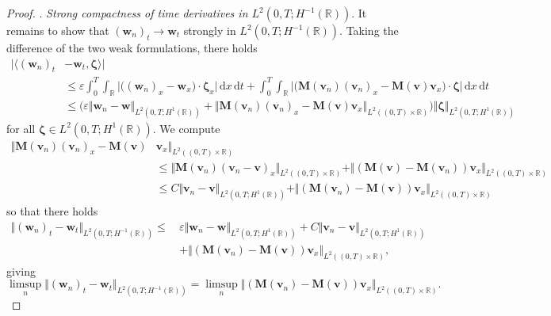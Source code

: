 \documentclass[10pt,a4paper]{amsart}
\newcommand{\bM}{\mathbf{M}}
\newcommand{\bv}{\mathbf{v}}
\newcommand{\bw}{\mathbf{w}}
\newcommand{\bzeta}{\boldsymbol{\zeta}}
\renewcommand{\d}{\, \mathrm{d}}
\renewcommand{\leq}{\leqslant}
\begin{document}
\begin{proof}
\smallskip 
{}. \textit{Strong compactness of time derivatives in $L^2(0,T;H^{-1}(\mathbb{R}))$}. It remains to show that $(\bw_n)_t \to \bw_t$ strongly in $L^2(0,T;H^{-1}(\mathbb{R}))$. Taking the difference of the two weak formulations, there holds 
\begin{equation*}
    \begin{aligned}
        |\langle (\bw_n)_t \! & - \! \bw_t , \bzeta \rangle| \\ 
        &\leq \varepsilon \int_0^T \int_\mathbb{R} \big| \big( (\bw_n)_x \! -\! \bw_x \big) \cdot \bzeta_x \big| \d x \d t + \int_0^T \int_\mathbb{R} \big| \big(\bM(\bv_n)(\bv_n)_x \! -\! \bM(\bv)\bv_x \big) \! \cdot \! \bzeta \big| \d x \d t \\ 
        &\leq \Big(\varepsilon \Vert \bw_n \! - \! \bw \Vert_{L^2(0,T;H^1(\mathbb{R}))} \!+\! \Vert \bM(\bv_n)(\bv_n)_x \!-\! \bM(\bv)\bv_x
 \Vert_{L^2((0,T)\times\mathbb{R})}\Big)\Vert \bzeta \Vert_{L^2(0,T;H^1(\mathbb{R}))}
    \end{aligned}
\end{equation*}
for all $\bzeta \in L^2(0,T;H^1(\mathbb{R}))$. We compute 
\begin{equation*}
    \begin{aligned}
        \Vert \bM(\bv_n)(\bv_n)_x - \bM(\bv)&\bv_x
 \Vert_{L^2((0,T)\times\mathbb{R})} \\ &\leq \Vert \bM(\bv_n)(\bv_n - \bv)_x \Vert_{L^2((0,T)\times\mathbb{R})} + \Vert (\bM(\bv) - \bM(\bv_n))\bv_x
 \Vert_{L^2((0,T)\times\mathbb{R})} \\ 
 &\leq C \Vert \bv_n \! - \! \bv \Vert_{L^2(0,T;H^1(\mathbb{R}))} + \Vert (\bM(\bv_n)\! -\! \bM(\bv) ) \bv_x\Vert_{L^2((0,T)\times\mathbb{R})}
    \end{aligned}
\end{equation*}
so that there holds 
\begin{equation*}
    \begin{aligned}
        \Vert (\bw_n)_t - \bw_t \Vert_{L^2(0,T;H^{-1}(\mathbb{R}))} \leq \, & \varepsilon \Vert \bw_n - \bw \Vert_{L^2(0,T;H^1(\mathbb{R}))} + C\Vert \bv_n - \bv \Vert_{L^2(0,T;H^1(\mathbb{R}))} \\ 
        &+ \Vert (\bM(\bv_n)\! -\! \bM(\bv) ) \bv_x\Vert_{L^2((0,T)\times\mathbb{R})}, 
    \end{aligned}
\end{equation*}
giving
\begin{equation*}
    \limsup_n  \Vert (\bw_n)_t - \bw_t \Vert_{L^2(0,T;H^{-1}(\mathbb{R}))} = \limsup_n \Vert (\bM(\bv_n)\! -\! \bM(\bv) ) \bv_x\Vert_{L^2((0,T)\times\mathbb{R})}. 

\end{equation*}
\end{proof}
\end{document}

